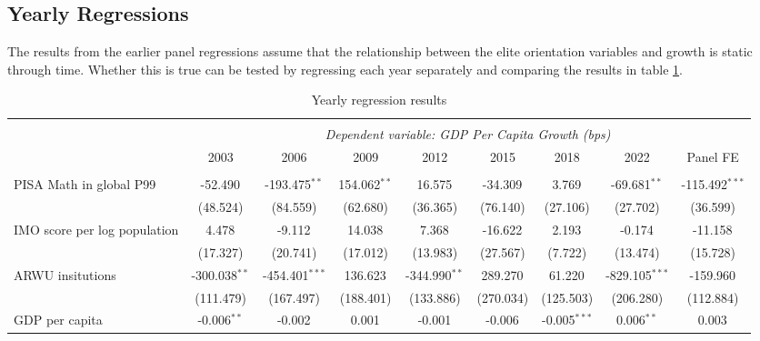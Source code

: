 \documentclass[11pt]{article}
\begin{document}
\subsection{Yearly Regressions}
The results from the earlier panel regressions assume that the relationship between the elite orientation variables and growth is static through time. Whether this is true can be tested by regressing each year separately and comparing the results in table \ref{table:yearly}.
\begin{table}[H] \centering
    \caption{Yearly regression results}
    \label{table:yearly}
    \resizebox{\linewidth}{!} {
        \begin{tabular}{@{\extracolsep{1pt}}lcccccccc}
            \\[-1.8ex]\hline
            \hline \\[-1.8ex]
            & \multicolumn{8}{c}{\textit{Dependent variable: GDP Per Capita Growth (bps)}} \
            \cr \cline{2-9}
            \\[-1.8ex] & \multicolumn{1}{c}{2003} & \multicolumn{1}{c}{2006} & \multicolumn{1}{c}{2009} & \multicolumn{1}{c}{2012} & \multicolumn{1}{c}{2015} & \multicolumn{1}{c}{2018} & \multicolumn{1}{c}{2022} & \multicolumn{1}{c}{Panel FE}  \\
            \hline \\[-1.8ex]
            PISA Math in global P99 & -52.490$^{}$ & -193.475$^{**}$ & 154.062$^{**}$ & 16.575$^{}$ & -34.309$^{}$ & 3.769$^{}$ & -69.681$^{**}$ & -115.492$^{***}$ \\
            & (48.524) & (84.559) & (62.680) & (36.365) & (76.140) & (27.106) & (27.702) & (36.599) \\
            IMO score per log population & 4.478$^{}$ & -9.112$^{}$ & 14.038$^{}$ & 7.368$^{}$ & -16.622$^{}$ & 2.193$^{}$ & -0.174$^{}$ & -11.158$^{}$ \\
            & (17.327) & (20.741) & (17.012) & (13.983) & (27.567) & (7.722) & (13.474) & (15.728) \\
            ARWU insitutions & -300.038$^{**}$ & -454.401$^{***}$ & 136.623$^{}$ & -344.990$^{**}$ & 289.270$^{}$ & 61.220$^{}$ & -829.105$^{***}$ & -159.960$^{}$ \\
            & (111.479) & (167.497) & (188.401) & (133.886) & (270.034) & (125.503) & (206.280) & (112.884) \\
            GDP per capita & -0.006$^{**}$ & -0.002$^{}$ & 0.001$^{}$ & -0.001$^{}$ & -0.006$^{}$ & -0.005$^{***}$ & 0.006$^{**}$ & 0.003$^{}$ \\

\end{tabular}}
\end{table}
\end{document}
